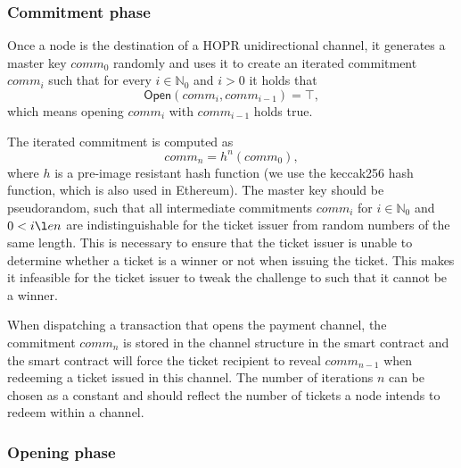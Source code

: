 \subsubsection{Commitment phase}

Once a node is the destination of a HOPR unidirectional channel, it generates a master key $comm_0$ randomly and uses it to create an iterated commitment $comm_i$ such that for every $i \in \mathbb{N}_0$ and $i > 0$ it holds that $$ \mathsf{Open}(comm_{i}, comm_{i-1}) = \top,$$ which means opening $comm_{i}$ with $comm_{i-1}$ holds true.

The iterated commitment is computed as $$comm_n = h^n(comm_0),$$ where $h$ is a pre-image resistant hash function (we use the keccak256 hash function, which is also used in Ethereum). The master key should be pseudorandom, such that all intermediate commitments $comm_{i}$ for $i \in \mathbb{N}_0$ and $0 < i \l en$ are indistinguishable for the ticket issuer from random numbers of the same length. This is necessary to ensure that the ticket issuer is unable to determine whether a ticket is a winner or not when issuing the ticket. This makes it infeasible for the ticket issuer to tweak the challenge to such that it cannot be a winner.

When dispatching a transaction that opens the payment channel, the commitment $comm_n$ is stored in the channel structure in the smart contract and the smart contract will force the ticket recipient to reveal $comm_{n-1}$ when redeeming a ticket issued in this channel. The number of iterations $n$ can be chosen as a constant and should reflect the number of tickets a node intends to redeem within a channel.

\subsubsection{Opening phase}


